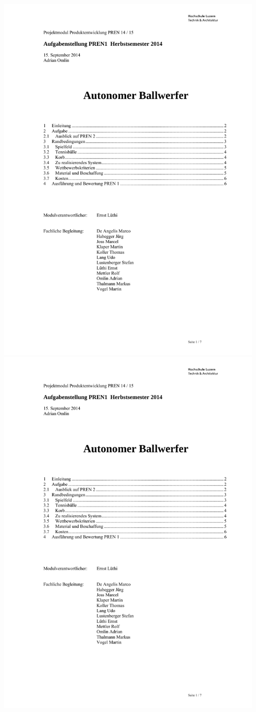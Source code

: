 \includegraphics[page=6,scale=0.86,clip,trim=33mm 20mm 20mm 28mm] {Enddokumentation/Anhang/Extern/Aufgabenstellung_PREN1_H14.pdf}
\newpage
\includegraphics[page=7,scale=0.86,clip,trim=32mm 20mm 20mm 22mm] {Enddokumentation/Anhang/Extern/Aufgabenstellung_PREN1_H14.pdf}